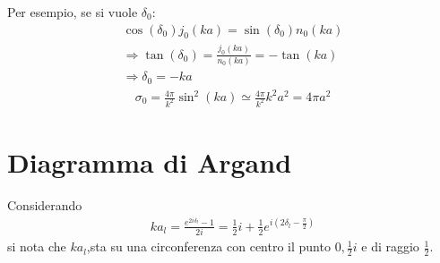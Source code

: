 Per esempio, se si vuole $\delta_0$:
\begin{equation}\begin{split}
\cos{\left(\delta_0\right)}j_0\left(ka\right)=\sin{\left(\delta_0\right)}n_0\left(ka\right)\\
\Longrightarrow \tan{\left(\delta_0\right)}=\frac{j_0\left(ka\right)}{n_0\left(ka\right)}=-\tan{\left(ka\right)}\\
\Longrightarrow \delta_0=-ka
\end{split}\end{equation}
\begin{equation}\begin{split}
\sigma_0=\frac{4\pi}{k^2}\sin^2{\left(ka\right)}\simeq \frac{4\pi}{k^2}k^2a^2=4\pi a^2
\end{split}\end{equation}

\section{Diagramma di Argand} %
Considerando
\begin{equation}\begin{split}
ka_l=\frac{e^{2i\delta_l}-1}{2i}=\frac{1}{2}i+\frac{1}{2}e^{i\left(2\delta_l-\frac{\pi}{2}\right)}
\end{split}\end{equation}
si nota che $ka_l$,sta su una circonferenza con centro il punto $0,\frac{1}{2}i$ e di raggio $\frac{1}{2}$.